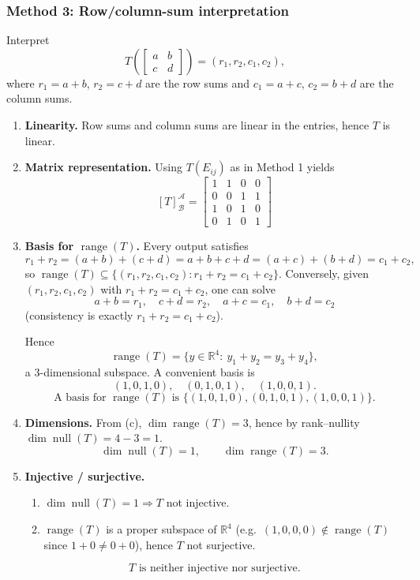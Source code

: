 \documentclass[12pt]{article}
\begin{document}
\subsubsection{Method 3: Row/column-sum interpretation}
Interpret
\[
T\!\left(\begin{bmatrix}a&b\\c&d\end{bmatrix}\right)=(r_1,r_2,c_1,c_2),
\]
where $r_1=a+b$, $r_2=c+d$ are the row sums and $c_1=a+c$, $c_2=b+d$ are the column sums.

\begin{enumerate}[label=(\alph*)]
\item \textbf{Linearity.}
Row sums and column sums are linear in the entries, hence $T$ is linear.

\item \textbf{Matrix representation.}
Using $T(E_{ij})$ as in Method 1 yields
\[
\boxed{\, [T]_{\mathcal{B}}^{\mathcal{A}}=
\begin{bmatrix}
1&1&0&0\\
0&0&1&1\\
1&0&1&0\\
0&1&0&1
\end{bmatrix}\,}
\]

\item \textbf{Basis for $\operatorname{range}(T)$.}
Every output satisfies
\[
r_1+r_2=(a+b)+(c+d)=a+b+c+d=(a+c)+(b+d)=c_1+c_2,
\]
so $\operatorname{range}(T)\subseteq\{(r_1,r_2,c_1,c_2): r_1+r_2=c_1+c_2\}$.
Conversely, given $(r_1,r_2,c_1,c_2)$ with $r_1+r_2=c_1+c_2$, one can solve
\[
a+b=r_1,\quad c+d=r_2,\quad a+c=c_1,\quad b+d=c_2
\]
(consistency is exactly $r_1+r_2=c_1+c_2$). 

Hence
\[
\operatorname{range}(T)=\{y\in\mathbb{R}^4:\ y_1+y_2=y_3+y_4\},
\]
a $3$-dimensional subspace. A convenient basis is
\[
(1,0,1,0),\quad (0,1,0,1),\quad (1,0,0,1).
\]
\[
\boxed{\,\text{A basis for }\operatorname{range}(T)\text{ is }\{(1,0,1,0),(0,1,0,1),(1,0,0,1)\}.\,}
\]

\item \textbf{Dimensions.}
From (c), $\dim\operatorname{range}(T)=3$, hence by rank--nullity $\dim\operatorname{null}(T)=4-3=1$.
\[
\boxed{\,\dim\operatorname{null}(T)=1,\qquad \dim\operatorname{range}(T)=3.\,}
\]

\item \textbf{Injective / surjective.}
\begin{enumerate}[label=(\roman*)]
\item $\dim\operatorname{null}(T)=1\Rightarrow T$ not injective.
\item $\operatorname{range}(T)$ is a proper subspace of $\mathbb{R}^4$ (e.g.\ $(1,0,0,0)\notin\operatorname{range}(T)$ since $1+0\ne 0+0$), hence $T$ not surjective.
\end{enumerate}
\[
\boxed{\,T\text{ is neither injective nor surjective.}\,}
\]
\end{enumerate}
\end{document}
